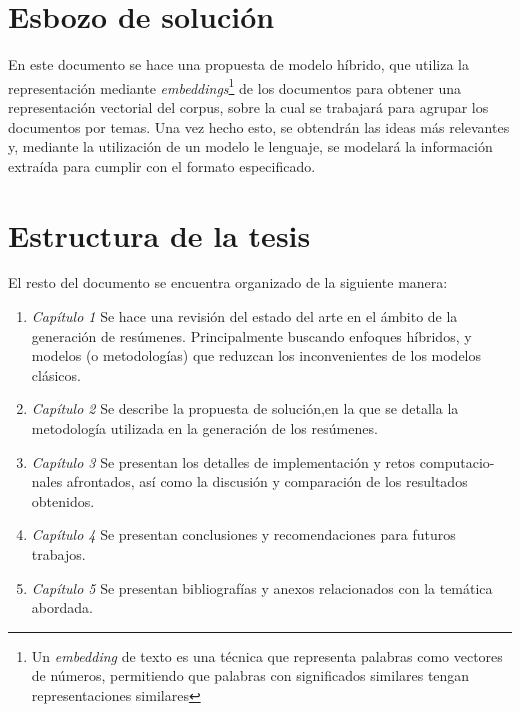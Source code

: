 \section{Esbozo de solución}
    En este documento se hace una propuesta de modelo híbrido, que utiliza la representación mediante \emph{embeddings}\footnote{Un \emph{embedding} de texto es una técnica que representa palabras como vectores de números, permitiendo que palabras con significados similares tengan representaciones similares}
    de los documentos para obtener una representación vectorial del corpus, sobre la cual se trabajará para agrupar los documentos por temas. Una vez hecho esto, se obtendrán las ideas más relevantes y, mediante la utilización de un modelo le lenguaje, se modelará la información extraída para cumplir con el formato especificado.

\section{Estructura de la tesis}
        El resto del documento se encuentra organizado de la siguiente manera:

        \begin{enumerate}
            \item \emph{Capítulo 1} Se hace una revisión del estado del arte en el ámbito de la generación de resúmenes. Principalmente buscando enfoques híbridos, y modelos (o metodologías) que reduzcan los inconvenientes de los modelos clásicos.
            \item \emph{Capítulo 2} Se describe la propuesta de solución,en la que se detalla la metodología utilizada en la generación de los resúmenes.
            \item \emph{Capítulo 3} Se presentan los detalles de implementación y retos computacio-
            nales afrontados, así como la discusión y comparación de los resultados obtenidos.
            \item \emph{Capítulo 4} Se presentan conclusiones y recomendaciones para futuros trabajos.
            \item \emph{Capítulo 5} Se presentan bibliografías y anexos relacionados con la temática abordada.
        \end{enumerate}


